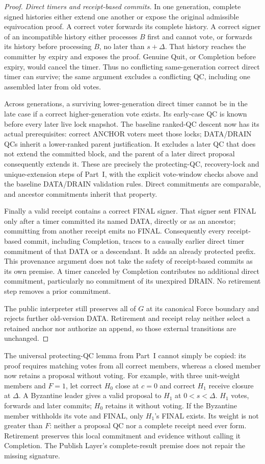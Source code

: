 \begin{proof}
\emph{Direct timers and receipt-based commits.}
In one generation, complete signed histories either extend one
another or expose the original admissible equivocation proof.
A correct voter forwards its complete history. A correct signer of
an incompatible history either processes $B$ first and cannot vote,
or forwards its history before processing $B$, no later than
$s+\Delta$. That history reaches the committer by expiry and exposes
the proof. Genuine Quit, or Completion before expiry, would cancel
the timer. Thus no conflicting same-generation correct direct timer
can survive; the same argument excludes a conflicting QC, including
one assembled later from old votes.

Across generations, a surviving lower-generation direct timer cannot
be in the late case if a correct higher-generation vote exists.
Its early-case QC is known before every later live lock snapshot.
The baseline ranked-QC descent now has its actual prerequisites:
correct ANCHOR voters meet those locks; DATA/DRAIN QCs inherit a
lower-ranked parent justification. It excludes a later QC that does
not extend the committed block, and the parent of a later direct
proposal consequently extends it. These are precisely the
protecting-QC, recovery-lock and unique-extension steps of Part~I,
with the explicit vote-window checks above and the baseline
DATA/DRAIN validation rules. Direct commitments are comparable, and
ancestor commitments inherit that property.

Finally a valid receipt contains a correct FINAL signer. That signer
sent FINAL only after a timer committed its named DATA, directly or
as an ancestor; committing from another receipt emits no FINAL.
Consequently every receipt-based commit, including Completion, traces
to a causally earlier direct timer commitment of that DATA or a
descendant. It adds an already protected prefix. This provenance
argument does not take the safety of receipt-based commits as its own
premise. A timer canceled by Completion contributes no additional
direct commitment, particularly no commitment of its unexpired DRAIN.
No retirement step removes a prior commitment.

The public interpreter still preserves all of $G$ at its canonical
Force boundary and rejects further old-version DATA. Retirement and
receipt relay neither select a retained anchor nor authorize an
append, so those external transitions are unchanged.
\end{proof}

The universal protecting-QC lemma from Part~I cannot simply be copied:
its proof requires matching votes from all correct members, whereas a
closed member now retains a proposal without voting. For example, with
three unit-weight members and $F=1$, let correct $H_0$ close at $c=0$
and correct $H_1$ receive closure at $\Delta$. A Byzantine leader gives
a valid proposal to $H_1$ at $0<s<\Delta$. $H_1$ votes, forwards and
later commits; $H_0$ retains it without voting. If the Byzantine member
withholds its vote and FINAL, only $H_1$'s FINAL exists. Its weight is
not greater than $F$: neither a proposal QC nor a complete receipt need
ever form. Retirement preserves this local commitment and evidence
without calling it Completion. The Publish Layer's complete-result
premise does not repair the missing signature.
